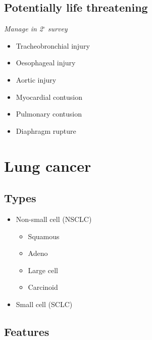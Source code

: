 \documentclass[
  12pt,
]{memoir}
\providecommand{\tightlist}{%
  \setlength{\itemsep}{0pt}\setlength{\parskip}{0pt}}
\begin{document}
\hypertarget{potentially-life-threatening}{%
\subsection{Potentially life
threatening}\label{potentially-life-threatening}}

\emph{Manage in 2\(^\circ\) survey}

\begin{itemize}
\tightlist
\item
  Tracheobronchial injury
\item
  Oesophageal injury
\item
  Aortic injury
\item
  Myocardial contusion
\item
  Pulmonary contusion
\item
  Diaphragm rupture
\end{itemize}

\hypertarget{lung-cancer}{%
\section{Lung cancer}\label{lung-cancer}}

\hypertarget{types-1}{%
\subsection{Types}\label{types-1}}

\begin{itemize}
\tightlist
\item
  Non-small cell (NSCLC)

  \begin{itemize}
  \tightlist
  \item
    Squamous
  \item
    Adeno
  \item
    Large cell
  \item
    Carcinoid
  \end{itemize}
\item
  Small cell (SCLC)
\end{itemize}

\hypertarget{features-1}{%
\subsection{Features}\label{features-1}}
\end{document}
